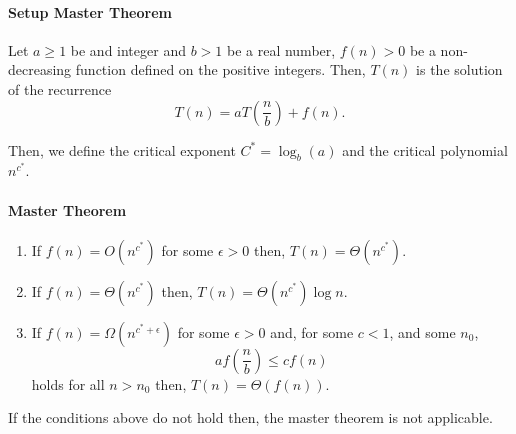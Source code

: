 \paragraph{Setup Master Theorem}
Let \(a \geq 1\)  be and integer and \(b > 1\) be a real number,
\(f(n) > 0\) be a non-decreasing function defined on the positive integers.
Then, \(T(n)\) is the solution of the recurrence
\[
    T(n) = a T\left( \frac{n}{b} \right) + f(n).
\]

Then, we define the critical exponent \(C^* = \log_b(a)\) 
and the critical polynomial \(n^{c^*}\).

\paragraph{Master Theorem}
\begin{enumerate}
    \item If \(f(n) = O(n^{c^*})\) for some \(\epsilon > 0\) then,
    \(T(n) = \Theta(n^{c^*})\).
    \item If \(f(n) = \Theta(n^{c^*})\) then,
    \(T(n) = \Theta (n^{c^*})\log n\).
    \item  If \(f(n) = \Omega(n^{c^* + \epsilon})\) for some \(\epsilon > 0\)
    and, for some \(c < 1\), and some \(n_0\),
    \[a f(\frac{n}{b}) \leq c f(n)\]
    holds for all \(n > n_0\) then, \(T(n) = \Theta(f(n))\).
\end{enumerate}

If the conditions above do not hold then, the master theorem is not
applicable.


